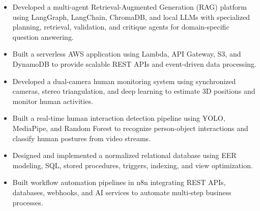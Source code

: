\documentclass[10pt,a4paper,sans]{moderncv}
\begin{document}
\begin{itemize}[leftmargin=0.35cm, label={\textbullet}, itemsep=0.3em, parsep=0pt]

    \item Developed a multi-agent Retrieval-Augmented Generation (RAG) platform using LangGraph, LangChain, ChromaDB, and local LLMs with specialized planning, retrieval, validation, and critique agents for domain-specific question answering.
    
    \item Built a serverless AWS application using Lambda, API Gateway, S3, and DynamoDB to provide scalable REST APIs and event-driven data processing.

    \item Developed a dual-camera human monitoring system using synchronized cameras, stereo triangulation, and deep learning to estimate 3D positions and monitor human activities.
    
    \item Built a real-time human interaction detection pipeline using YOLO, MediaPipe, and Random Forest to recognize person-object interactions and classify human postures from video streams.


    \item Designed and implemented a normalized relational database using EER modeling, SQL, stored procedures, triggers, indexing, and view optimization.

    \item Built workflow automation pipelines in n8n integrating REST APIs, databases, webhooks, and AI services to automate multi-step business processes.

\end{itemize}
\vspace*{-6mm}
\end{document}
